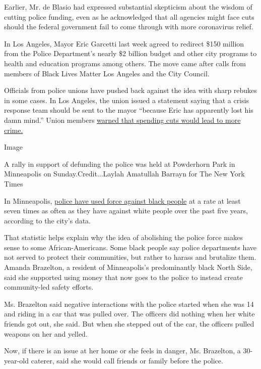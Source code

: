 Earlier, Mr. de Blasio had expressed substantial skepticism about the
wisdom of cutting police funding, even as he acknowledged that all
agencies might face cuts should the federal government fail to come
through with more coronavirus relief.

In Los Angeles, Mayor Eric Garcetti last week agreed to redirect \$150
million from the Police Department's nearly \$2 billion budget and other
city programs to health and education programs among others. The move
came after calls from members of Black Lives Matter Los Angeles and the
City Council.

Officials from police unions have pushed back against the idea with
sharp rebukes in some cases. In Los Angeles, the union issued a
statement saying that a crisis response team should be sent to the mayor
``because Eric has apparently lost his damn mind.'' Union members
\href{https://abc7.com/mayor-eric-garcetti-lapd-george-floyd-police-misconduct/6234091/}{warned
that spending cuts would lead to more crime.}

Image

A rally in support of defunding the police was held at Powderhorn Park
in Minneapolis on Sunday.Credit...Laylah Amatullah Barrayn for The New
York Times

In Minneapolis,
\href{https://www.nytimes3xbfgragh.onion/interactive/2020/06/03/us/minneapolis-police-use-of-force.html}{police
have used force against black people} at a rate at least seven times as
often as they have against white people over the past five years,
according to the city's data.

That statistic helps explain why the idea of abolishing the police force
makes sense to some African-Americans. Some black people say police
departments have not served to protect their communities, but rather to
harass and brutalize them. Amanda Brazelton, a resident of Minneapolis's
predominantly black North Side, said she supported using money that now
goes to the police to instead create community-led safety efforts.

Ms. Brazelton said negative interactions with the police started when
she was 14 and riding in a car that was pulled over. The officers did
nothing when her white friends got out, she said. But when she stepped
out of the car, the officers pulled weapons on her and yelled.

Now, if there is an issue at her home or she feels in danger, Ms.
Brazelton, a 30-year-old caterer, said she would call friends or family
before the police.

